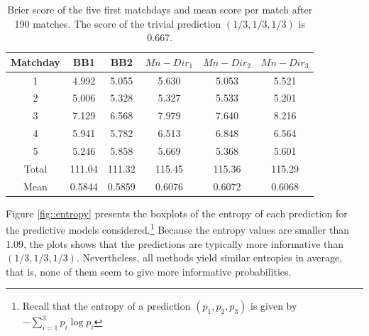 \documentclass[journal,article,accept,moreauthors,pdftex,12pt,a4paper]{mdpi}
\begin{document}
\begin{table}[H]
\begin{center}
\begin{tabular}{cccccc}
\hline
Matchday & BB1 & BB2 & $Mn-Dir_1$ & $Mn-Dir_2$ & $Mn-Dir_3$\\
\hline
\hline
1 &4.992 & 5.055 & 5.630 & 5.053 & 5.521 \\
2 &5.006 & 5.328 & 5.327 & 5.533 & 5.201 \\
3 &7.129 & 6.568 & 7.979 & 7.640 & 8.216 \\
4 &5.941 & 5.782 & 6.513 & 6.848 & 6.564 \\
5 &5.246 & 5.858 & 5.669 & 5.368 & 5.601 \\
\hline
Total & 111.04 & 111.32 & 115.45 & 115.36 & 115.29 \\
\hline
Mean & 0.5844 & 0.5859 & 0.6076 & 0.6072 & 0.6068 \\
\hline
\end{tabular}
\caption{Brier score of the five first matchdays and mean score per match after 190 matches.
The score of the trivial prediction $(1/3,1/3,1/3)$ is 0.667.}
\label{tab::brier}
\end{center}
\end{table}


Figure \ref{fig::entropy} presents the boxplots of the entropy of each prediction for the predictive models considered.\footnote{Recall
that the entropy of a prediction $(p_1,p_2,p_3)$ is given by $- \sum_{i=1}^3 p_i \log{p_i}$} 
Because the entropy values are smaller than 1.09, 
the plots shows that the predictions
are typically more informative than $(1/3,1/3,1/3)$. Nevertheless, all methods yield similar entropies in average, that is,
none of them seem to give more informative probabilities.
\end{document}
